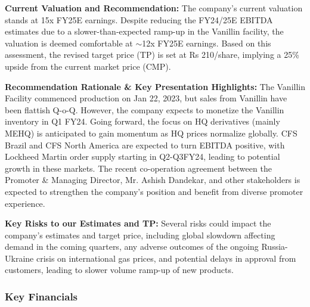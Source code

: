\textbf{Current Valuation and Recommendation:}
The company's current valuation stands at 15x FY25E earnings. Despite reducing the FY24/25E EBITDA estimates due to a slower-than-expected ramp-up in the Vanillin facility, the valuation is deemed comfortable at $\sim$12x FY25E earnings. Based on this assessment, the revised target price (TP) is set at Rs 210/share, implying a 25\% upside from the current market price (CMP).

\textbf{Recommendation Rationale \& Key Presentation Highlights:}
The Vanillin Facility commenced production on Jan 22, 2023, but sales from Vanillin have been flattish Q-o-Q. However, the company expects to monetize the Vanillin inventory in Q1 FY24. Going forward, the focus on HQ derivatives (mainly MEHQ) is anticipated to gain momentum as HQ prices normalize globally. CFS Brazil and CFS North America are expected to turn EBITDA positive, with Lockheed Martin order supply starting in Q2-Q3FY24, leading to potential growth in these markets. The recent co-operation agreement between the Promoter \& Managing Director, Mr. Ashish Dandekar, and other stakeholders is expected to strengthen the company's position and benefit from diverse promoter experience.

\textbf{Key Risks to our Estimates and TP:}
Several risks could impact the company's estimates and target price, including global slowdown affecting demand in the coming quarters, any adverse outcomes of the ongoing Russia-Ukraine crisis on international gas prices, and potential delays in approval from customers, leading to slower volume ramp-up of new products.

\subsubsection{Key Financials}


